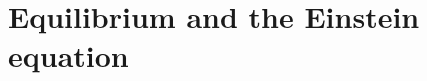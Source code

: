 \documentclass[aps,prd,twocolumn,showpacs,groupedaddress,nofootinbib,longbibliography]{revtex4-1}
\def\beq{\begin{equation}}
\def\eeq{\end{equation}}
\def\la{\langle}
\def\ra{\rangle}
\def\d{\delta}\def\D{\Delta}
\def\O{\Omega}
\begin{document}
 



\section{Equilibrium and the Einstein equation}
\end{document}
